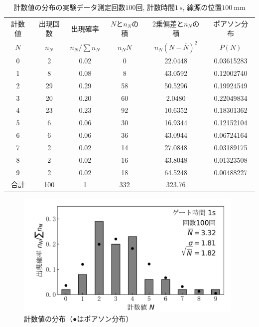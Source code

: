 \documentclass{jarticle}
\begin{document}
\begin{table}[H]
  \caption{計数値の分布の実験データ\protect\linebreak 測定回数$100$回, 計数時間$1\ \mathrm{s}$, 線源の位置$100\ \mathrm{mm}$}
  \label{tb:count-distribution-100mm-100times}
  \hspace{-1cm}
  \begin{tabular}{cccccc}
    \hline
    計数値 & 出現回数 & 出現確率 & $N$と$n_N$の積 & 2乗偏差と$n_N$の積 & ポアソン分布 \\
    $N$ & $n_N$ & $n_N/\sum n_N$ & $n_N N$ & $n_N(N-\overline{N})^2$ & $P(N)$ \\
    \hline
    0 & 2 & 0.02 & 0 & 22.0448 & 0.03615283 \\
    1 & 8 & 0.08 & 8 & 43.0592 & 0.12002740 \\
    2 & 29 & 0.29 & 58 & 50.5296 & 0.19924549 \\
    3 & 20 & 0.20 & 60 & 2.0480 & 0.22049834 \\
    4 & 23 & 0.23 & 92 & 10.6352 & 0.18301362 \\
    5 & 6 & 0.06 & 30 & 16.9344 & 0.12152104 \\
    6 & 6 & 0.06 & 36 & 43.0944 & 0.06724164 \\
    7 & 2 & 0.02 & 14 & 27.0848 & 0.03189175 \\
    8 & 2 & 0.02 & 16 & 43.8048 & 0.01323508 \\
    9 & 2 & 0.02 & 18 & 64.5248 & 0.00488227 \\
    \hline
    合計 & 100 & 1 & 332 & 323.76 & \\
    \hline
  \end{tabular}
\end{table}

\begin{figure}[H]
  \begin{center}
    \includegraphics[width=110mm]{graph/count-distribution-100mm-100times.png}
    \caption{計数値の分布（●はポアソン分布）}
    \label{fg:count-distribution-100mm-100times}
  \end{center}
\end{figure}
\end{document}
